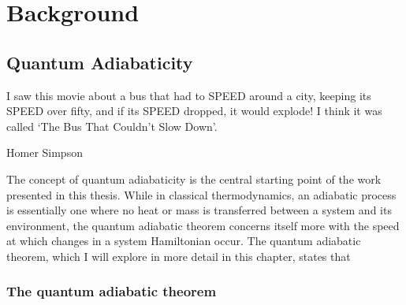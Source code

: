 \part{Background}
\chapter{Quantum Adiabaticity}\label{chap:2_adiabaticity}

\epigraph{I saw this movie about a bus that had to SPEED around a city, keeping its SPEED over fifty, and if its SPEED dropped, it would explode! I think it was called `The Bus That Couldn’t Slow Down'.}{Homer Simpson}

    
The concept of quantum adiabaticity is the central starting point of the work presented in this thesis. While in classical thermodynamics, an adiabatic process is essentially one where no heat or mass is transferred between a system and its environment, the quantum adiabatic theorem concerns itself more with the speed at which changes in a system Hamiltonian occur. The quantum adiabatic theorem, which I will explore in more detail in this chapter, states that 
        
    \section{The quantum adiabatic theorem}\label{sec:2.1_adiabatic_theorem}
    
